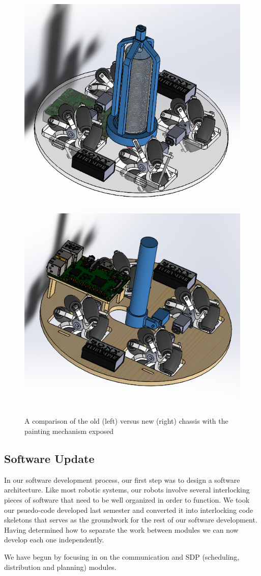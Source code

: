 \begin{figure}[h!]
\centering
\includegraphics[width=0.49\columnwidth]{CAD/old_painting_highlighted.PNG}
\includegraphics[width=0.49\columnwidth]{CAD/new_painting_highlighted.PNG}
\label{fig:em3}
\caption{A comparison of the old (left) versus new (right) chassis with the painting mechanism exposed}
\end{figure}

\clearpage
 
\subsection{Software Update}
\label{sec:software_progress}

In our software development process, our first step was to design a software architecture. Like most robotic systems, our robots involve several interlocking pieces of software that need to be well organized in order to function. We took our psuedo-code developed last semester and converted it into interlocking code skeletons that serves as the groundwork for the rest of our software development. Having determined how to separate the work between modules we can now develop each one independently. 

We have begun by focusing in on the communication and SDP (scheduling, distribution and planning) modules. 

